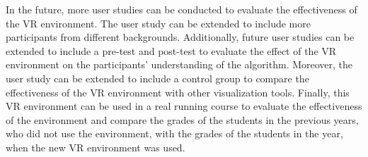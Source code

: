In the future, more user studies can be conducted to evaluate the effectiveness of the \ac{VR} environment. The user study can be extended to include more participants from different backgrounds. Additionally, future user studies can be extended to include a pre-test and post-test to evaluate the effect of the \ac{VR} environment on the participants' understanding of the algorithm. Moreover, the user study can be extended to include a control group to compare the effectiveness of the \ac{VR} environment with other visualization tools. Finally, this \ac{VR} environment can be used in a real running course to evaluate the effectiveness of the environment and compare the grades of the students in the previous years, who did not use the environment, with the grades of the students in the year, when the new \ac{VR} environment was used.
